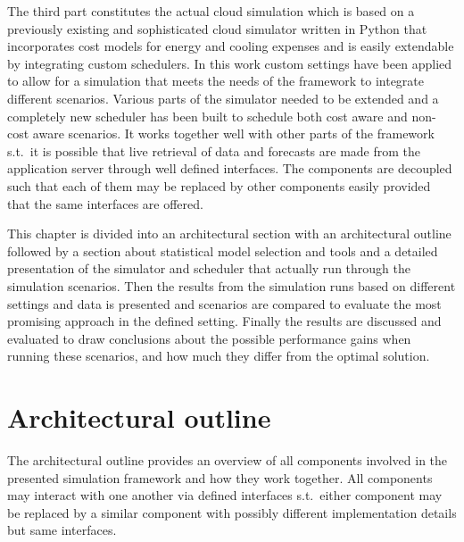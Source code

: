 The third part constitutes the actual cloud simulation which is based on a previously existing and sophisticated cloud simulator written in Python that incorporates cost models for energy and cooling expenses and is easily extendable by integrating custom schedulers. In this work custom settings have been applied to allow for a simulation that meets the needs of the framework to integrate different scenarios. Various parts of the simulator needed to be extended and a completely new scheduler has been built to schedule both cost aware and non-cost aware scenarios. It works together well with other parts of the framework s.t.~it is possible that live retrieval of data and forecasts are made from the application server through well defined interfaces. The components are decoupled such that each of them may be replaced by other components easily provided that the same interfaces are offered. 

This chapter is divided into an architectural section with an architectural outline followed by a section about statistical model selection and tools and a detailed presentation of the simulator and scheduler that actually run through the simulation scenarios. Then the results from the simulation runs based on different settings and data is presented and scenarios are compared to evaluate the most promising approach in the defined setting. Finally the results are discussed and evaluated to draw conclusions about the possible performance gains when running these scenarios, and how much they differ from the optimal solution. 


\section{Architectural outline}

The architectural outline provides an overview of all components involved in the presented simulation framework and how they work together. All components may interact with one another via defined interfaces s.t.~either component may be replaced by a similar component with possibly different implementation details but same interfaces. 

